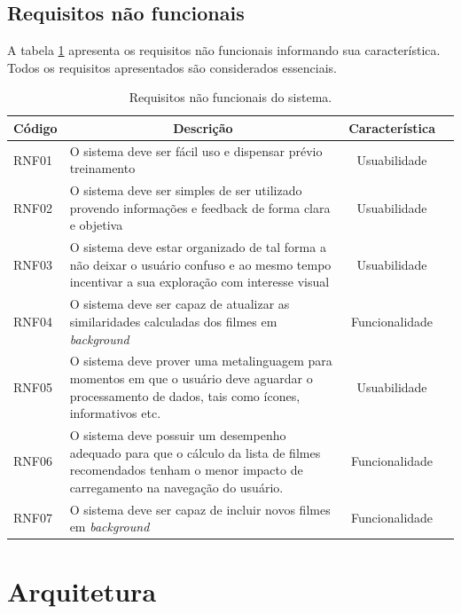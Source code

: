 \subsection{Requisitos não funcionais}

A tabela \ref{tab:req-nao-funcionais} apresenta os requisitos não funcionais informando sua característica. Todos os requisitos apresentados são considerados essenciais.

\begin{table}[H]
	\centering
	\caption{Requisitos não funcionais do sistema.}
	\label{tab:req-nao-funcionais}
	\bgroup
	\def\arraystretch{1.3} %
	\begin{tabular}{| m{1.3cm} | m{9.4cm}| c | m{2cm}}
		\hline
		\multicolumn{1}{|c|}{\bfseries Código} & \multicolumn{1}{c|}{\bfseries Descrição} & \multicolumn{1}{c|}{\bfseries Característica} \\ \hline
		RNF01	& O sistema deve ser fácil uso e dispensar prévio treinamento	& Usuabilidade \\ \hline
		RNF02	& O sistema deve ser simples de ser utilizado provendo informações e feedback de forma clara e objetiva	& Usuabilidade \\ \hline
		RNF03	& O sistema deve estar organizado de tal forma a não deixar o usuário confuso e ao mesmo tempo incentivar a sua exploração com interesse visual	& Usuabilidade \\ \hline
		RNF04	& O sistema deve ser capaz de atualizar as similaridades calculadas dos filmes em \textit{background}	& Funcionalidade \\ \hline
		RNF05	& O sistema deve prover uma metalinguagem para momentos em que o usuário deve aguardar o processamento de dados, tais como ícones, informativos etc.	& Usuabilidade \\ \hline
		RNF06	& O sistema deve possuir um desempenho adequado para que o cálculo da lista de filmes recomendados tenham o menor impacto de carregamento na navegação do usuário.	& Funcionalidade \\ \hline
		RNF07	& O sistema deve ser capaz de incluir novos filmes em \textit{background}	& Funcionalidade	
	\end{tabular}
	\egroup
\end{table}

\section{Arquitetura}

